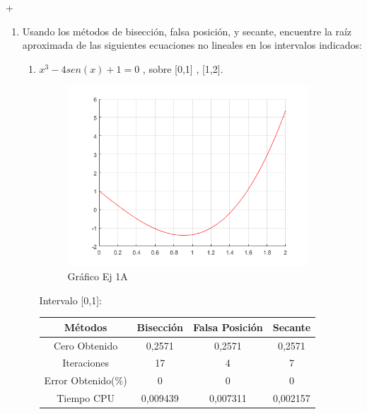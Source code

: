 +\documentclass{udpreport}
\begin{document}
\begin{enumerate}
\item Usando los métodos de bisección, falsa posición, y secante, encuentre la raíz aproximada 
de las siguientes ecuaciones no lineales en los intervalos indicados:

    \begin{enumerate}
        
    Para realizar estas ecuaciones se utilizaron los programas de :
    \begin{itemize}
        \item Biseccion.m
        \item Secante.m
        \item FalsaPosicion.m
    \end{itemize}
    y las comparaciones de error se hicieron en base a el resultado de la función fzero de matlab
    
    \item  \(x^3 - 4sen(x) +1 = 0\) , sobre [0,1] , [1,2].
        \begin{figure}[H]
            \centering
            \includegraphics[width=9cm]{ec1.png}
             \caption{Gráfico Ej 1A}
        \end{figure}
        
            \begin{table}[H]Intervalo [0,1]:
            \centering
                \begin{tabular} { |c|c|c|c|}
                \hline
                Métodos       & Bisección & Falsa Posición & Secante  \\
                \hline
                Cero Obtenido &  0,2571       &    0,2571      &      0,2571    \\
                \hline
                Iteraciones   &    17        &     4     &       7        \\
                \hline
                Error Obtenido(\%) &       0      &       0      &     0         \\
                \hline
                Tiempo CPU &       0,009439     &      0,007311     &     0,002157         \\
                 \hline
                \end{tabular}
            \end{table}
            

\end{enumerate}
\end{enumerate}
\end{document}
